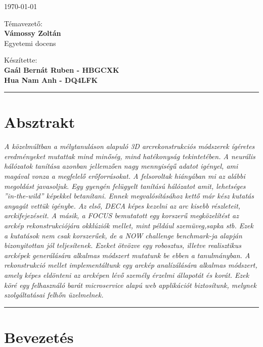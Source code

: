 \documentclass[12pt,a4]{article}
\begin{document}
\begin{titlepage}
\begin{center}
			\vspace{0.2cm}
			\large
			\today
			
			\vspace{1cm}
			
			Témavezető:\\
			\textbf{Vámossy Zoltán}\\
			Egyetemi docens
			
			\vspace{1cm}
			
			Készítette:\\
			\textbf{Gaál Bernát Ruben - HBGCXK\\
			Hua Nam Anh - DQ4LFK}					
		\end{center}
	\end{titlepage}
	\renewcommand*\contentsname{Tartalomjegyzék}
	\tableofcontents
	\newpage
	\par\noindent\rule{\textwidth}{0.4pt}
	\section*{Absztrakt}
	 \emph{
		A közelmúltban a mélytanuláson alapuló 3D arcrekonstrukciós módszerek
		ígéretes eredményeket mutattak mind minőség, mind hatékonyság tekintetében. A neurális hálózatok tanítása azonban jellemzően nagy mennyiségű
		adatot igényel, ami magával vonza a megfelelő erőforrásokat.
		A felsoroltak hiányában mi az alábbi megoldást javasoljuk. Egy gyengén
		felügyelt tanítású hálózatot amit, lehetséges ”in-the-wild” képekkel betanítani.
		Ennek megvalósításához kettő már kész kutatás anyagát vettük igénybe. Az
		első, \cite{deca}DECA képes kezelni az arc kisebb részleteit, arckifejezéseit. A
		másik, a \cite{focus}FOCUS bemutatott egy korszerű megközelítést az arckép rekonstrukciójára okklúziók mellet, mint például szemüveg,sapka stb. Ezek a kutatások nem csak korszerűek, de a NOW challenge benchmark-ja alapján bizonyitottan jól teljesítenek. Ezeket ötvözve egy robosztus, illetve realisztikus
		arcképek generálására alkalmas módszert mutatunk be ebben a tanulmányban.
		A rekonstrukció mellet implementáltunk egy arckép analízálására alkalmas módszert, amely képes eldönteni az arcképen lévő személy érzelmi
		állapotát és korát. Ezek köré egy felhasználó barát microservice alapú web
		applikációt biztosítunk, melynek szolgáltatásai felhőn üzelmelnek.
		}
	 \par\noindent\rule{\textwidth}{0.4pt}
	 
\section{Bevezetés}
	  
\end{document}
